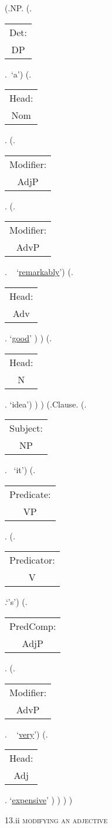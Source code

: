 \documentclass[12pt,letterpaper]{article}
\begin{document}
\begin{figure}
	\begin{center}
		\begin{parsetree}
			(.NP.
			(.\begin{tabular}{c}Det:\\DP\end{tabular}.~`a')
			(.\begin{tabular}{c}Head:\\Nom\end{tabular}.
			(.\begin{tabular}{c}Modifier:\\AdjP\end{tabular}.
			(.\begin{tabular}{c}Modifier:\\AdvP\end{tabular}. ~ `\underline{remarkably}')
			(.\begin{tabular}{c}Head:\\Adv\end{tabular}. `\underline{\underline{good}}' )
			)
			(.\begin{tabular}{c}Head:\\N\end{tabular}. `idea')
			)
			)
			(.Clause.
			(.\begin{tabular}{c}Subject:\\NP\end{tabular}. ~`it')
			(.\begin{tabular}{c}Predicate:\\VP\end{tabular}.
			(.\begin{tabular}{c}Predicator:\\V\end{tabular}.`{'s}')
			(.\begin{tabular}{c}PredComp:\\AdjP\end{tabular}.
			(.\begin{tabular}{c}Modifier:\\AdvP\end{tabular}. ~ `\underline{very}')
			(.\begin{tabular}{c}Head:\\Adj\end{tabular}.
			 `\underline{\underline{expensive}}' )
			)
			)
			)
			
			\hfill \break\hfill \break
		\end{parsetree}
		13.ii \textsc{modifying an adjective}
	\end{center}
\end{figure}
\end{document}
